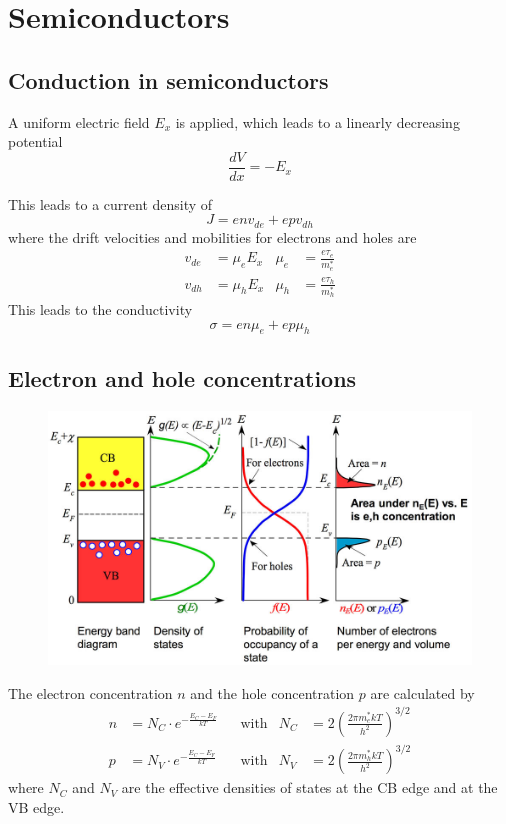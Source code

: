 \section{Semiconductors}

\subsection{Conduction in semiconductors}
A uniform electric field $E_x$ is applied, which leads to a linearly decreasing potential
\begin{equation}
    \frac{dV}{dx} = -E_x
\end{equation}


This leads to a current density of
\begin{equation}
    J = e n v_{de} + e p v_{dh}
\end{equation}
where the drift velocities and mobilities for electrons and holes are
\begin{align*}
    v_{de} &= \mu_e E_x & \mu_e &= \frac{e \tau_e}{m_e^*} \\
    v_{dh} &= \mu_h E_x & \mu_h &= \frac{e \tau_h}{m_h^*}
\end{align*}
This leads to the conductivity
\begin{equation}
    \sigma = e n \mu_e + e p \mu_h
\end{equation}

\subsection{Electron and hole concentrations}
\begin{figure}[ht!]
    \centering
    \includegraphics[width=0.6\linewidth]{images/semicond_elec_hole_concentration.jpg}
\end{figure}

The electron concentration $n$ and the hole concentration $p$ are calculated by
\begin{align}
    n &= N_C \cdot e^{-\frac{E_C-E_F}{k T}} && \text{with} & N_C &= 2 \left( \frac{2 \pi m_e^* k T}{h^2} \right)^{3/2} \\
    p &= N_V \cdot e^{-\frac{E_C-E_F}{k T}} && \text{with} & N_V &= 2 \left( \frac{2 \pi m_h^* k T}{h^2} \right)^{3/2}
\end{align}
where $N_C$ and $N_V$ are the effective densities of states at the CB edge and at the VB edge.

